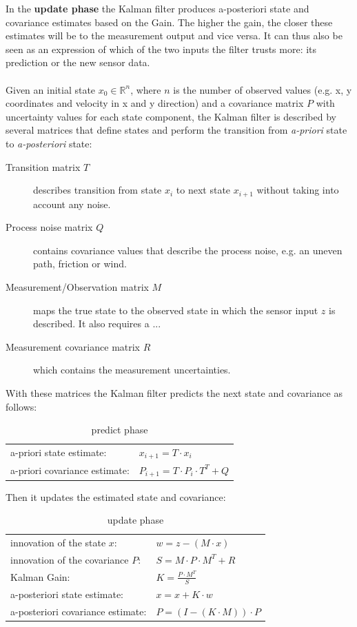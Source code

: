 In the \textbf{update phase} the Kalman filter produces a-posteriori state and covariance estimates based on the Gain. The higher the gain, the closer these estimates will be to the measurement output and vice versa. It can thus also be seen as an expression of which of the two inputs the filter trusts more: its prediction or the new sensor data.
\\\\
Given an initial state $x_0\in \mathbb{R}^n$, where $n$ is the number of observed values (e.g. x, y coordinates and velocity in x and y direction) and a covariance matrix $P$ with uncertainty values for each state component, the Kalman filter is described by several matrices that define states and perform the transition from \textit{a-priori} state to \textit{a-posteriori} state:
\begin{description}
\item[Transition matrix $T$] describes transition from state $x_i$ to next state $x_{i+1}$ without taking into account any noise.
\item[Process noise matrix $Q$] contains covariance values that describe the process noise, e.g. an uneven path, friction or wind.
\item[Measurement/Observation matrix $M$] maps the true state to the observed state in which the sensor input $z$ is described. It also requires a ...
\item[Measurement covariance matrix $R$] which contains the measurement uncertainties.
\end{description}

With these matrices the Kalman filter predicts the next state and covariance as follows:
\begin{table}[ht]
\begin{center}
\begin{tabular}{l l}
a-priori state estimate: & $x_{i+1} = T \cdot x_i$ \\
a-priori covariance estimate: & $P_{i+1} = T \cdot P_i \cdot T^T + Q$\\
\end{tabular}
\caption*{predict phase}
\end{center}
\end{table}

Then it updates the estimated state and covariance:

\begin{table}[ht]
\begin{center}
\begin{tabular}{l l}
innovation of the state $x$: & $w = z - (M \cdot x)$\\
innovation of the covariance $P$: & $S = M \cdot P \cdot M^T + R$\\
Kalman Gain: & $K = \frac{P \cdot M^T}{S}$\\
a-posteriori state estimate: & $x = x + K \cdot w$ \\
a-posteriori covariance estimate: & $P = (I - (K \cdot M)) \cdot P$\\
\end{tabular}
\caption*{update phase}
\end{center}
\end{table}

